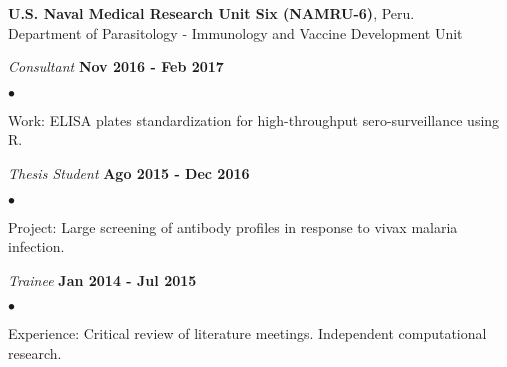 \documentclass[margin,line]{res}
\newenvironment{list1}{
  \begin{list}{\ding{113}}{%
      \setlength{\itemsep}{0in}
      \setlength{\parsep}{0in} \setlength{\parskip}{0in}
      \setlength{\topsep}{0in} \setlength{\partopsep}{0in}
      \setlength{\leftmargin}{0.17in}}}{\end{list}}
\newenvironment{list2}{
  \begin{list}{$\bullet$}{%
      \setlength{\itemsep}{0in}
      \setlength{\parsep}{0in} \setlength{\parskip}{0in}
      \setlength{\topsep}{0in} \setlength{\partopsep}{0in}
      \setlength{\leftmargin}{0.2in}}}{\end{list}}
\begin{document}
\begin{resume}
{\bf U.S. Naval Medical Research Unit Six (NAMRU-6)}, Peru.\\
Department of Parasitology - Immunology and Vaccine Development Unit\\
\vspace*{-.1in}
\begin{list1}
	\item[] {\em Consultant} \hfill {\bf Nov 2016 - Feb 2017}\\
	\vspace*{-.1in}
	\begin{list2} %
		\item Work: ELISA plates standardization for high-throughput sero-surveillance using R.\\%
	\end{list2}
	\vspace*{-.1in}
	\item[] {\em Thesis Student} \hfill {\bf Ago 2015 - Dec 2016}\\
	\vspace*{-.1in}
	\begin{list2} %
		\item Project: Large screening of antibody profiles in response to vivax malaria infection.\\
	\end{list2}
	\vspace*{-.1in}
	\item[] {\em Trainee} \hfill {\bf Jan 2014 - Jul 2015}\\
	\vspace*{-.1in}
	\begin{list2} %
		\item Experience: Critical review of literature meetings. Independent computational research.

\end{list2}
\end{list1}
\end{resume}
\end{document}
